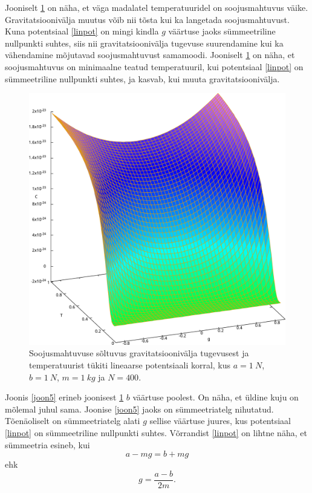 \documentclass{trkut}%
\begin{document}
Jooniselt \ref{joon1} on näha, et väga madalatel temperatuuridel on soojusmahtuvus väike.
Gravitatsioonivälja muutus võib nii tõsta kui ka langetada soojusmahtuvust.
Kuna potentsiaal \eqref{linpot} on mingi kindla $g$ väärtuse jaoks sümmeetriline nullpunkti suhtes, siis nii gravitatsioonivälja tugevuse suurendamine kui ka vähendamine mõjutavad soojusmahtuvust samamoodi.
Jooniselt \ref{joon1} on näha, et soojusmahtuvus on minimaalne teatud temperatuuril, kui potentsiaal \eqref{linpot} on sümmeetriline nullpunkti suhtes, ja kasvab, kui muuta gravitatsioonivälja.

\begin{figure}[htb!]
    \includegraphics[width=\textwidth]{maxima/m1a1b1T0_1S400_2.pdf}
    \caption{Soojusmahtuvuse sõltuvus gravitatsioonivälja tugevusest ja temperatuurist tükiti lineaarse potentsiaali korral, kus $a=\SI{1}{N}$, $b=\SI{1}{N}$, $m=\SI{1}{kg}$ ja $N=400$.}
    \label{joon1}
\end{figure}

Joonis \ref{joon5} erineb joonisest \ref{joon1} $b$ väärtuse poolest.
On näha, et üldine kuju on mõlemal juhul sama.
Joonise \ref{joon5} jaoks on sümmeetriatelg nihutatud.
Tõenäoliselt on sümmeetriatelg alati $g$ sellise väärtuse juures, kus potentsiaal \eqref{linpot} on sümmeetriline nullpunkti suhtes.
Võrrandist \eqref{linpot} on lihtne näha, et sümmeetria esineb, kui
\begin{equation}
    a-mg=b+mg
\end{equation}
ehk
\begin{equation}
    g=\frac{a-b}{2m}.
\end{equation}
\end{document}
